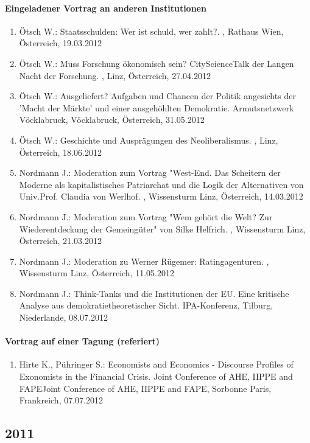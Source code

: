 \paragraph{Eingeladener Vortrag an anderen Institutionen}
\begin{enumerate}
	\item Ötsch W.: Staatsschulden: Wer ist schuld, wer zahlt?. , Rathaus Wien, Österreich, 19.03.2012
	\item Ötsch W.: Muss Forschung ökonomisch sein? CityScienceTalk der Langen Nacht der Forschung. , Linz, Österreich, 27.04.2012
	\item Ötsch W.: Ausgeliefert? Aufgaben und Chancen der Politik angesichts der 'Macht der Märkte' und einer ausgehöhlten Demokratie. Armutsnetzwerk Vöcklabruck, Vöcklabruck, Österreich, 31.05.2012
	\item Ötsch W.: Geschichte und Ausprägungen des Neoliberalismus. , Linz, Österreich, 18.06.2012
	\item Nordmann J.: Moderation zum Vortrag "West-End. Das Scheitern der Moderne als kapitalistisches Patriarchat und die Logik der Alternativen von Univ.Prof. Claudia von Werlhof. , Wissensturm Linz, Österreich, 14.03.2012
	\item Nordmann J.: Moderation zum Vortrag "Wem gehört die Welt? Zur Wiederentdeckung der Gemeingüter" von Silke Helfrich. , Wissensturm Linz, Österreich, 21.03.2012
	\item Nordmann J.: Moderation zu Werner Rügemer: Ratingagenturen. , Wissensturm Linz, Österreich, 11.05.2012
	\item Nordmann J.: Think-Tanks und die Institutionen der EU. Eine kritische Analyse aus demokratietheoretischer Sicht. IPA-Konferenz, Tilburg, Niederlande, 08.07.2012
\end{enumerate}
\paragraph{Vortrag auf einer Tagung (referiert)}
\begin{enumerate}
	\item Hirte K., Pühringer S.: Economists and Economics - Discourse Profiles of Exonomists in the Financial Crisis. Joint Conference of AHE, IIPPE and FAPEJoint Conference of AHE, IIPPE and FAPE, Sorbonne Paris, Frankreich, 07.07.2012
\end{enumerate}
\subsection*{2011}

